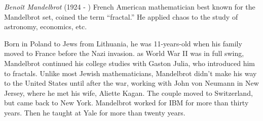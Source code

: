 \documentclass[12pt]{article}
\begin{document}

\emph{Beno\^it Mandelbrot} (1924 - ) French American mathematician best known for the Mandelbrot set, coined the term ``fractal.'' He applied chaos  to the study of astronomy, economics, etc.

Born in Poland to Jews from Lithuania, he was 11-years-old when his family moved to France before the Nazi invasion.  as World War II was in full swing, Mandelbrot continued his college studies with Gaston Julia, who introduced him to fractals. Unlike most Jewish mathematicians, Mandelbrot didn't make his way to the United States until after the war, working with John von Neumann in New Jersey, where he met his wife, Aliette Kagan. The couple moved to Switzerland, but came back to New York. Mandelbrot worked for IBM for more than thirty years. Then he taught at Yale for more than twenty years.
\end{document}
